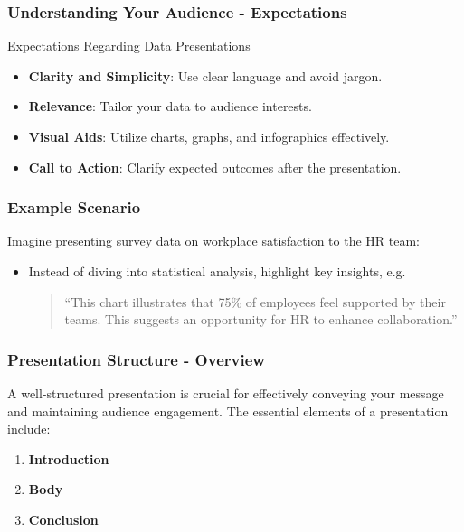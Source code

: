 \documentclass[aspectratio=169]{beamer}
\begin{document}
\begin{frame}[fragile]
    \frametitle{Understanding Your Audience - Expectations}
    \begin{block}{Expectations Regarding Data Presentations}
        \begin{itemize}
            \item \textbf{Clarity and Simplicity}: Use clear language and avoid jargon.
            \item \textbf{Relevance}: Tailor your data to audience interests.
            \item \textbf{Visual Aids}: Utilize charts, graphs, and infographics effectively.
            \item \textbf{Call to Action}: Clarify expected outcomes after the presentation.
        \end{itemize}
    \end{block}
\end{frame}

\begin{frame}[fragile]
    \frametitle{Example Scenario}
    Imagine presenting survey data on workplace satisfaction to the HR team:
    \begin{itemize}
        \item Instead of diving into statistical analysis, highlight key insights, e.g. 
        \begin{quote}
            “This chart illustrates that 75\% of employees feel supported by their teams. This suggests an opportunity for HR to enhance collaboration.”
        \end{quote}
    \end{itemize}
\end{frame}

\begin{frame}[fragile]
    \frametitle{Presentation Structure - Overview}
    A well-structured presentation is crucial for effectively conveying your message and maintaining audience engagement. The essential elements of a presentation include:

    \begin{enumerate}
        \item \textbf{Introduction}
        \item \textbf{Body}
        \item \textbf{Conclusion}
    \end{enumerate}
\end{frame}
\end{document}
